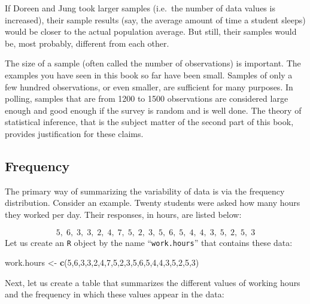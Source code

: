 \documentclass[]{krantz}
\makeatletter
\newenvironment{Shaded}{\begin{snugshade}}{\end{snugshade}}
\newcommand{\DecValTok}[1]{\textcolor[rgb]{0.00,0.00,0.81}{#1}}
\newcommand{\KeywordTok}[1]{\textcolor[rgb]{0.13,0.29,0.53}{\textbf{#1}}}
\newcommand{\NormalTok}[1]{#1}
\newcommand{\StringTok}[1]{\textcolor[rgb]{0.31,0.60,0.02}{#1}}
\newenvironment{kframe}{%
\medskip{}
\setlength{\fboxsep}{.8em}
 \def\at@end@of@kframe{}%
 \ifinner\ifhmode%
  \def\at@end@of@kframe{\end{minipage}}%
  \begin{minipage}{\columnwidth}%
 \fi\fi%
 \def\FrameCommand##1{\hskip\@totalleftmargin \hskip-\fboxsep
 \colorbox{shadecolor}{##1}\hskip-\fboxsep
     \hskip-\linewidth \hskip-\@totalleftmargin \hskip\columnwidth}%
 \MakeFramed {\advance\hsize-\width
   \@totalleftmargin\z@ \linewidth\hsize
   \@setminipage}}%
 {\par\unskip\endMakeFramed%
 \at@end@of@kframe}
\renewenvironment{Shaded}{\begin{kframe}}{\end{kframe}}
\theoremstyle{definition}
\theoremstyle{definition}
\theoremstyle{definition}
\theoremstyle{remark}
\makeatother
\begin{document}
If Doreen and Jung took larger samples (i.e.~the number of data values
is increased), their sample results (say, the average amount of time a
student sleeps) would be closer to the actual population average. But
still, their samples would be, most probably, different from each other.

The size of a sample (often called the number of observations) is
important. The examples you have seen in this book so far have been
small. Samples of only a few hundred observations, or even smaller, are
sufficient for many purposes. In polling, samples that are from 1200 to
1500 observations are considered large enough and good enough if the
survey is random and is well done. The theory of statistical inference,
that is the subject matter of the second part of this book, provides
justification for these claims.

\hypertarget{frequency}{%
\subsection{Frequency}\label{frequency}}

The primary way of summarizing the variability of data is via the
frequency distribution. Consider an example. Twenty students were asked
how many hours they worked per day. Their responses, in hours, are
listed below:

\[5,\; 6,\; 3,\; 3,\; 2,\; 4,\; 7,\; 5,\; 2,\; 3,\; 5,\; 6,\; 5,\; 4,\; 4,\; 3,\; 5,\; 2,\; 5,\; 3\]
Let us create an \texttt{R} object by the name ``\texttt{work.hours}'' that contains
these data:

\begin{Shaded}
\begin{Highlighting}[]
\NormalTok{work.hours <-}\StringTok{ }\KeywordTok{c}\NormalTok{(}\DecValTok{5}\NormalTok{,}\DecValTok{6}\NormalTok{,}\DecValTok{3}\NormalTok{,}\DecValTok{3}\NormalTok{,}\DecValTok{2}\NormalTok{,}\DecValTok{4}\NormalTok{,}\DecValTok{7}\NormalTok{,}\DecValTok{5}\NormalTok{,}\DecValTok{2}\NormalTok{,}\DecValTok{3}\NormalTok{,}\DecValTok{5}\NormalTok{,}\DecValTok{6}\NormalTok{,}\DecValTok{5}\NormalTok{,}\DecValTok{4}\NormalTok{,}\DecValTok{4}\NormalTok{,}\DecValTok{3}\NormalTok{,}\DecValTok{5}\NormalTok{,}\DecValTok{2}\NormalTok{,}\DecValTok{5}\NormalTok{,}\DecValTok{3}\NormalTok{)}
\end{Highlighting}
\end{Shaded}

Next, let us create a table that summarizes the different values of
working hours and the frequency in which these values appear in the
data:
\end{document}
